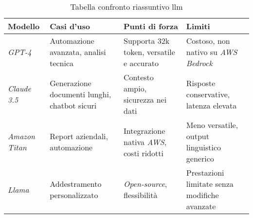 \begin{table}[H]
    \label{tab:confronto-lllm}
    \begin{tabularx}{\textwidth}{|X|X|X|X|}
    \hline
    \textbf{Modello} & \textbf{Casi d'uso} & \textbf{Punti di forza} & \textbf{Limiti}\\
    \hline
    \textit{GPT-4} & Automazione avanzata, analisi tecnica & Supporta 32k \gls{token}, versatile e accurato & Costoso, non nativo su \textit{AWS Bedrock}   \\
    \hline
    \textit{Claude 3.5} & Generazione documenti lunghi, chatbot sicuri & Contesto ampio, sicurezza nei dati & Risposte conservative, latenza elevata \\
    \hline
    \textit{Amazon Titan} & Report aziendali, automazione & Integrazione nativa \textit{AWS}, costi ridotti & Meno versatile, output linguistico generico \\
    \hline
    \textit{Llama} & Addestramento personalizzato & \textit{Open-source}, flessibilità & Prestazioni limitate senza modifiche avanzate \\
    \hline
    \end{tabularx}
    \caption{Tabella confronto riassuntivo \gls{llm}}
    \end{table}%
